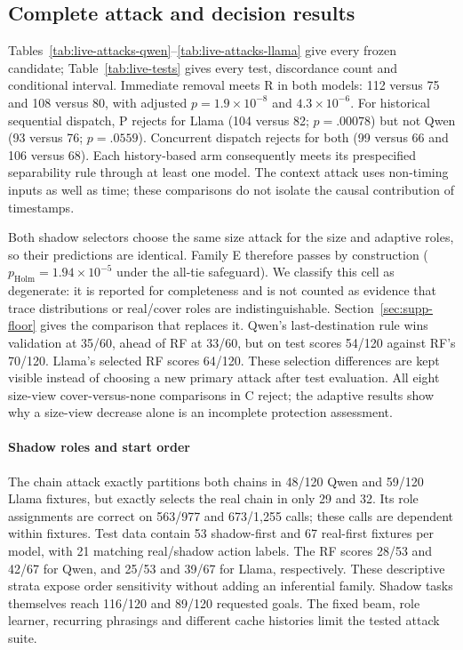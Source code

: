 \subsection{Complete attack and decision results}
Tables~\ref{tab:live-attacks-qwen}--\ref{tab:live-attacks-llama} give every frozen candidate; Table~\ref{tab:live-tests} gives every test, discordance count and conditional interval. Immediate removal meets R in both models: 112 versus 75 and 108 versus 80, with adjusted $p=1.9\times10^{-8}$ and $4.3\times10^{-6}$. For historical sequential dispatch, P rejects for Llama (104 versus 82; $p=.00078$) but not Qwen (93 versus 76; $p=.0559$). Concurrent dispatch rejects for both (99 versus 66 and 106 versus 68). Each history-based arm consequently meets its prespecified separability rule through at least one model. The context attack uses non-timing inputs as well as time; these comparisons do not isolate the causal contribution of timestamps.

Both shadow selectors choose the same size attack for the size and adaptive roles, so their predictions are identical. Family E therefore passes by construction ($p_{\mathrm{Holm}}=1.94\times10^{-5}$ under the all-tie safeguard). We classify this cell as degenerate: it is reported for completeness and is not counted as evidence that trace distributions or real/cover roles are indistinguishable. Section~\ref{sec:supp-floor} gives the comparison that replaces it. Qwen's last-destination rule wins validation at 35/60, ahead of RF at 33/60, but on test scores 54/120 against RF's 70/120. Llama's selected RF scores 64/120. These selection differences are kept visible instead of choosing a new primary attack after test evaluation. All eight size-view cover-versus-none comparisons in C reject; the adaptive results show why a size-view decrease alone is an incomplete protection assessment.





\paragraph{Shadow roles and start order}
The chain attack exactly partitions both chains in 48/120 Qwen and 59/120 Llama fixtures, but exactly selects the real chain in only 29 and 32. Its role assignments are correct on 563/977 and 673/1,255 calls; these calls are dependent within fixtures. Test data contain 53 shadow-first and 67 real-first fixtures per model, with 21 matching real/shadow action labels. The RF scores 28/53 and 42/67 for Qwen, and 25/53 and 39/67 for Llama, respectively. These descriptive strata expose order sensitivity without adding an inferential family. Shadow tasks themselves reach 116/120 and 89/120 requested goals. The fixed beam, role learner, recurring phrasings and different cache histories limit the tested attack suite.

